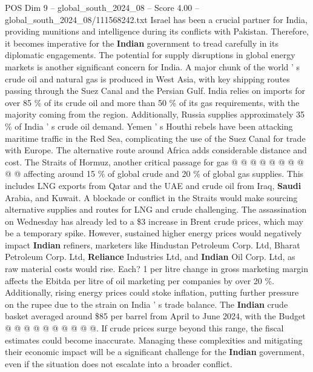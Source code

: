 \begin{textsample}{POS Dim 9 – global\_south\_2024\_08 – Score 4.00 – global\_south\_2024\_08/111568242.txt}
Israel has been a crucial partner for India, providing munitions and intelligence during its conflicts with Pakistan.
Therefore, it becomes imperative for the \textbf{Indian} government to tread carefully in its diplomatic engagements.
The potential for supply disruptions in global energy markets is another significant concern for India.
A major chunk of the world ' s crude oil and natural gas is produced in West Asia, with key shipping routes passing through the Suez Canal and the Persian Gulf.
India relies on imports for over 85 \% of its crude oil and more than 50 \% of its gas requirements, with the majority coming from the region.
Additionally, Russia supplies approximately 35 \% of India ' s crude oil demand.
Yemen ' s Houthi rebels have been attacking maritime traffic in the Red Sea, complicating the use of the Suez Canal for trade with Europe.
The alternative route around Africa adds considerable distance and cost.
The Straits of Hormuz, another critical passage for gas @ @ @ @ @ @ @ @ @ @ affecting around 15 \% of global crude and 20 \% of global gas supplies.
This includes LNG exports from Qatar and the UAE and crude oil from Iraq, \textbf{Saudi} Arabia, and Kuwait.
A blockade or conflict in the Straits would make sourcing alternative supplies and routes for LNG and crude challenging.
The assassination on Wednesday has already led to a \$3 increase in Brent crude prices, which may be a temporary spike.
However, sustained higher energy prices would negatively impact \textbf{Indian} refiners, marketers like Hindustan Petroleum Corp.
Ltd, Bharat Petroleum Corp.
Ltd, \textbf{Reliance} Industries Ltd, and \textbf{Indian} Oil Corp.
Ltd, as raw material costs would rise.
Each? 1 per litre change in gross marketing margin affects the Ebitda per litre of oil marketing per companies by over 20 \%.
Additionally, rising energy prices could stoke inflation, putting further pressure on the rupee due to the strain on India ' s trade balance.
The \textbf{Indian} crude basket averaged around \$85 per barrel from April to June 2024, with the Budget @ @ @ @ @ @ @ @ @ @.
If crude prices surge beyond this range, the fiscal estimates could become inaccurate.
Managing these complexities and mitigating their economic impact will be a significant challenge for the \textbf{Indian} government, even if the situation does not escalate into a broader conflict.

\end{textsample}
